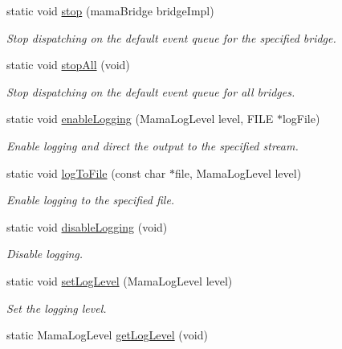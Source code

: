 \begin{DoxyCompactItemize}
static void \hyperlink{classWombat_1_1Mama_a88d25e14a503f35d86173bfaee50922e}{stop} (mamaBridge bridgeImpl)
\begin{DoxyCompactList}\small\item\em Stop dispatching on the default event queue for the specified bridge. \item\end{DoxyCompactList}\item 
static void \hyperlink{classWombat_1_1Mama_a5e5eeaecf4309a709e8448dfcbbc5d89}{stopAll} (void)
\begin{DoxyCompactList}\small\item\em Stop dispatching on the default event queue for all bridges. \item\end{DoxyCompactList}\item 
static void \hyperlink{classWombat_1_1Mama_a4b73e9c99a4e170c8d2ed378746c5f72}{enableLogging} (MamaLogLevel level, FILE $\ast$logFile)
\begin{DoxyCompactList}\small\item\em Enable logging and direct the output to the specified stream. \item\end{DoxyCompactList}\item 
static void \hyperlink{classWombat_1_1Mama_a53e48c0d9a4bc014cfbdcc189609399c}{logToFile} (const char $\ast$file, MamaLogLevel level)
\begin{DoxyCompactList}\small\item\em Enable logging to the specified file. \item\end{DoxyCompactList}\item 
static void \hyperlink{classWombat_1_1Mama_a519f2d70a7a3784068db8419ffec64c0}{disableLogging} (void)
\begin{DoxyCompactList}\small\item\em Disable logging. \item\end{DoxyCompactList}\item 
static void \hyperlink{classWombat_1_1Mama_afaa40b807211f0d42a7badabe8d0c632}{setLogLevel} (MamaLogLevel level)
\begin{DoxyCompactList}\small\item\em Set the logging level. \item\end{DoxyCompactList}\item 
static MamaLogLevel \hyperlink{classWombat_1_1Mama_a735937f0a46d4e5685b24369a0675c11}{getLogLevel} (void)

\end{DoxyCompactItemize}
